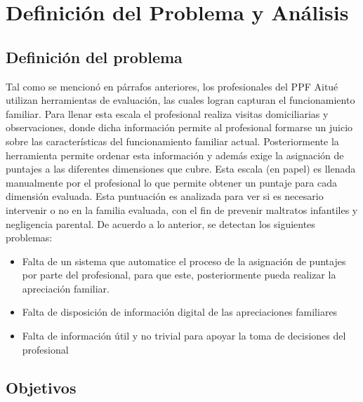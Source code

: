 \chapter{Definición del Problema y Análisis}
\label{definicion}

\section{Definición del problema} \label{prob}

\vspace{1mm}
\normalsize

Tal como se mencionó en párrafos anteriores, los profesionales del PPF Aitué utilizan herramientas de evaluación, las cuales logran capturan  el funcionamiento familiar.
Para llenar esta escala el profesional realiza visitas domiciliarias y observaciones, donde dicha información permite al profesional formarse un juicio sobre las características del funcionamiento familiar actual. Posteriormente la herramienta permite ordenar esta información y además exige la asignación de puntajes a las diferentes dimensiones que cubre. 
Esta escala (en papel) es llenada manualmente por el profesional lo que permite obtener un puntaje para cada dimensión evaluada. Esta puntuación es analizada para ver si es necesario intervenir o no en la familia evaluada, con el fin de prevenir maltratos infantiles y negligencia parental.\cite{VALENCIA2010}
De acuerdo a lo anterior, se detectan los siguientes problemas:

\begin{itemize}
	\item Falta de un sistema que automatice el proceso de la asignación de puntajes por parte del profesional, para que este, posteriormente pueda realizar la apreciación familiar.
	\item Falta de disposición de información digital de las apreciaciones familiares
	\item Falta de información útil y no trivial para apoyar la toma de decisiones del profesional  
\end{itemize}

\vspace{1mm}

\section{Objetivos}

\vspace{1mm}

